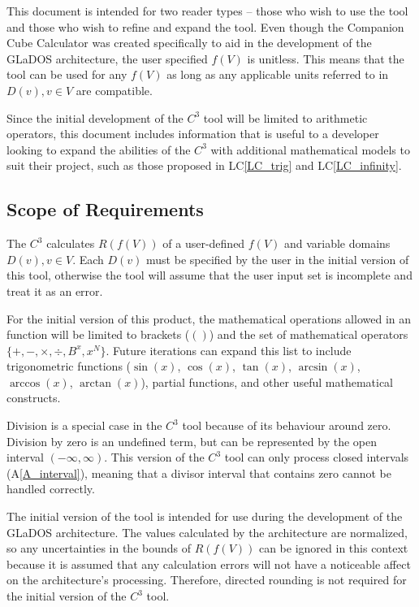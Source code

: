 \documentclass[12pt]{article}
\newcommand{\aref}[1]{A\ref{#1}}
\newcommand{\lcref}[1]{LC\ref{#1}}
\newcommand{\progname}{Companion Cube Calculator} %
\newcommand{\prognameAbbrv}{$C^{3}$}
\begin{document}
This document is intended for two reader types -- those who wish to use the 
tool and those who wish to refine and expand the tool. Even though the 
\progname{} was created specifically to aid in the development of the GLaDOS 
architecture, the user specified $f(V)$ is unitless. This means that the tool 
can be used for any $f(V)$ as long as any applicable units referred to in 
$D(v), v \in V$ are compatible.

Since the initial development of the \prognameAbbrv{} tool will be limited to 
arithmetic operators, this document includes information that is useful to a 
developer looking to expand the abilities of the \prognameAbbrv{} with 
additional mathematical models to suit their project, such as those proposed in 
\lcref{LC_trig} and \lcref{LC_infinity}. 

\subsection{Scope of Requirements} 
\label{sec_scope}
The \prognameAbbrv{} calculates $R(f(V))$ of a user-defined $f(V)$ and variable 
domains $D(v), v \in V$. Each $D(v)$ must be specified by the user in the 
initial version of this tool, otherwise the tool will assume that the user 
input set is incomplete and treat it as an error.

For the initial version of this product, the mathematical operations allowed in 
an function will be limited to brackets ($()$) and the set of mathematical 
operators $\{+, -, \times, \div, B^x, x^N\}$. Future iterations can expand this 
list to include trigonometric functions ($\sin(x)$, $\cos(x)$, $\tan(x)$, 
$\arcsin(x)$, $\arccos(x)$, $\arctan(x)$), partial functions, and other useful 
mathematical constructs.

Division is a special case in the \prognameAbbrv{} tool because of its 
behaviour around zero. Division by zero is an undefined term, but can be 
represented by the open interval $(-\infty, \infty)$. This version of the 
\prognameAbbrv{} tool can only process closed intervals (\aref{A_interval}), 
meaning that a divisor interval that contains zero cannot be handled correctly. 

The initial version of the tool is intended for use during the development of 
the GLaDOS architecture. The values calculated by the architecture are 
normalized, so any uncertainties in the bounds of $R(f(V))$ can be ignored in 
this context because it is assumed that any calculation errors will not have a 
noticeable affect on the architecture's processing. Therefore, directed 
rounding is not required for the initial version of the \prognameAbbrv{} tool.
\end{document}
